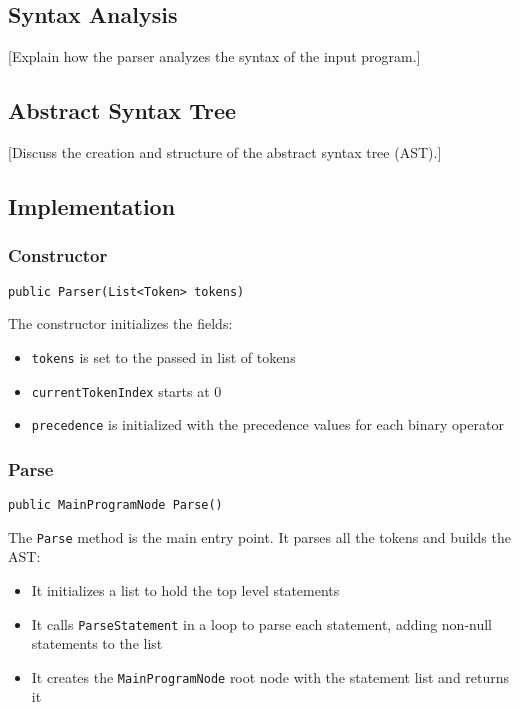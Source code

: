 \documentclass{article}
\begin{document}
\subsection{Syntax Analysis}

[Explain how the parser analyzes the syntax of the input program.]

\subsection{Abstract Syntax Tree}

[Discuss the creation and structure of the abstract syntax tree (AST).]


\subsection{Implementation}

\subsubsection{Constructor}
\begin{lstlisting}[language={[Sharp]C}]
public Parser(List<Token> tokens)
\end{lstlisting}

The constructor initializes the fields:

\begin{itemize}
\item \texttt{tokens} is set to the passed in list of tokens
\item \texttt{currentTokenIndex} starts at 0
\item \texttt{precedence} is initialized with the precedence values for each binary operator
\end{itemize}

\subsubsection{Parse}

\begin{lstlisting}[language={[Sharp]C}]
public MainProgramNode Parse()
\end{lstlisting}

The \texttt{Parse} method is the main entry point. It parses all the tokens and builds the AST:
\begin{itemize}
\item It initializes a list to hold the top level statements
\item It calls \texttt{ParseStatement} in a loop to parse each statement, adding non-null statements to the list
\item It creates the \texttt{MainProgramNode} root node with the statement list and returns it
\end{itemize}
\end{document}
